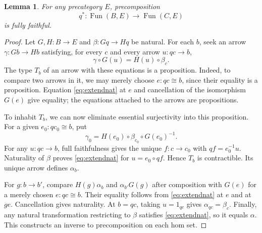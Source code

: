 \documentclass[11pt]{amsart}
\newtheorem{lemma}[theorem]{Lemma}
\theoremstyle{definition}
\theoremstyle{remark}
\newcommand{\Fun}{\operatorname{Fun}}
\begin{document}
\begin{lemma}\label{lem:ff}
For any precategory $E$, precomposition
\[
 q^*:\Fun(B,E)\longrightarrow\Fun(C,E)
\]
is fully faithful.
\end{lemma}
\begin{proof}
Let $G,H:B\to E$ and $\beta:Gq\to Hq$ be natural. For each $b$, seek an
arrow $\gamma:Gb\to Hb$ satisfying, for every $c$ and every arrow
$u:qc\to b$,
\begin{equation}\label{eq:extendnat}
 \gamma\circ G(u)=H(u)\circ\beta_c.
\end{equation}
The type $T_b$ of an arrow with these equations is a proposition.
Indeed, to compare two arrows in it, we may merely choose
$e:qc\cong b$, since their equality is a proposition. Equation
\eqref{eq:extendnat} at $e$ and cancellation of the isomorphism $G(e)$
give equality; the equations attached to the arrows are propositions.

To inhabit $T_b$, we can now eliminate essential surjectivity into this
proposition. For a given $e_0:qc_0\cong b$, put
\[
 \gamma_0=H(e_0)\circ\beta_{c_0}\circ G(e_0)^{-1}.
\]
For any $u:qc\to b$, full faithfulness gives the unique $f:c\to c_0$
with $qf=e_0^{-1}u$. Naturality of $\beta$ proves
\eqref{eq:extendnat} for $u=e_0\circ qf$. Hence $T_b$ is contractible.
Its unique arrow defines $\alpha_b$.

For $g:b\to b'$, compare $H(g)\alpha_b$ and $\alpha_{b'}G(g)$ after
composition with $G(e)$ for a merely chosen $e:qc\cong b$. Their equality
follows from \eqref{eq:extendnat} at $e$ and at $ge$. Cancellation gives
naturality. At $b=qc$, taking $u=1_{qc}$ gives $\alpha_{qc}=\beta_c$.
Finally, any natural transformation restricting to $\beta$ satisfies
\eqref{eq:extendnat}, so it equals $\alpha$. This constructs an inverse
to precomposition on each hom set.
\end{proof}
\end{document}

